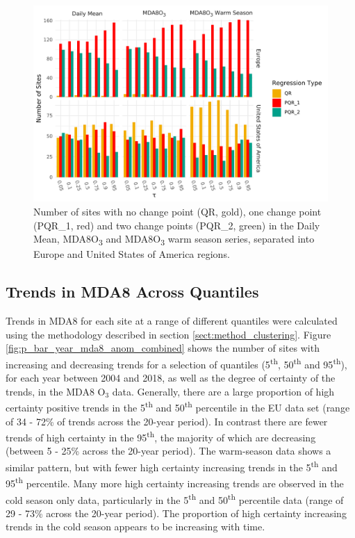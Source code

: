 \documentclass[journal abbreviation, manuscript]{copernicus}
\begin{document}
\begin{figure}[h!]
\includegraphics[width=12cm]{figures/paper_figures/regression_type_bars_o3.pdf}
\caption{Number of sites with no change point (QR, gold), one change point (PQR\_1, red) and two change points (PQR\_2, green) in the Daily Mean, MDA8O\textsubscript{3} and MDA8O\textsubscript{3} warm season series, separated into Europe and United States of America regions.}
\label{fig:regression_type}
\end{figure}




\subsection{Trends in MDA8 Across Quantiles} \label{sect:new_mda8_trends}

Trends in MDA8 for each site at a range of different quantiles were calculated using the methodology described in section \ref{sect:method_clustering}. Figure \ref{fig:p_bar_year_mda8_anom_combined} shows the number of sites with increasing and decreasing trends for a selection of quantiles (5\textsuperscript{th}, 50\textsuperscript{th} and 95\textsuperscript{th}), for each year between 2004 and 2018, as well as the degree of certainty of the trends, in the MDA8 O$_3$ data. Generally, there are a large proportion of high certainty positive trends in the 5\textsuperscript{th} and 50\textsuperscript{th} percentile in the EU data set (range of 34 - 72\% of trends across the 20-year period). In contrast there are fewer trends of high certainty in the 95\textsuperscript{th}, the majority of which are decreasing (between 5 - 25\% across the 20-year period). The warm-season data shows a similar pattern, but with fewer high certainty increasing trends in the 5\textsuperscript{th} and 95\textsuperscript{th} percentile. Many more high certainty increasing trends are observed in the cold season only data, particularly in the 5\textsuperscript{th} and 50\textsuperscript{th} percentile data (range of 29 - 73\% across the 20-year period). The proportion of high certainty increasing trends in the cold season appears to be increasing with time.
\end{document}
